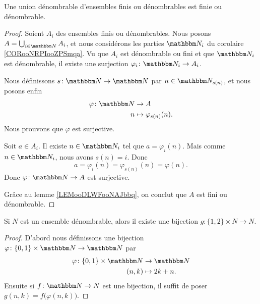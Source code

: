 \begin{proposition}     \label{PROPooENTPooSPpmhY}
    Une union dénombrable d'ensembles finis ou dénombrables est finie ou dénombrable.
\end{proposition}

\begin{proof}
    Soient \( A_i\) des ensembles finis ou dénombrables. Nous posons \( A=\bigcup_{i\in \eN}A_i\), et nous considérons les parties \( \eN_i\) du corolaire \ref{CORooNRPIooZPSmqa}. Vu que \( A_i\) est dénombrable ou fini et que \( \eN_i\) est dénombrable, il existe une surjection \( \varphi_i\colon \eN_i\to A_i\).

    Nous définissons \( s\colon \eN\to \eN\) par \( n\in \eN_{s(n)}\), et nous posons enfin
    \begin{equation}
        \begin{aligned}
            \varphi\colon \eN&\to A \\
            n&\mapsto \varphi_{s(n)}(n). 
        \end{aligned}
    \end{equation}
    Nous prouvons que \( \varphi\) est surjective.

    Soit \( a\in A_i\). Il existe \( n\in \eN_i\) tel que \( a=\varphi_i(n)\). Mais comme \( n\in \eN_i\), nous avons \( s(n)=i\). Donc
    \begin{equation}
        a=\varphi_i(n)=\varphi_{s(n)}(n)=\varphi(n).
    \end{equation}
    Donc \( \varphi\colon \eN\to A\) est surjective.

    Grâce au lemme \ref{LEMooDLWFooNAJbbq}, on conclut que \( A\) est fini ou dénombrable.
\end{proof}

\begin{lemma}        \label{LEMooRXSRooBUWOyb}
    Si \( N\) est un ensemble dénombrable, alors il existe une bijection \( g\colon \{ 1,2 \}\times N\to N\).
\end{lemma}

\begin{proof}
    D'abord nous définissons une bijection \( \varphi\colon \{ 0,1 \}\times \eN\to \eN\) par
    \begin{equation}
        \begin{aligned}
            \varphi\colon \{ 0,1 \}\times \eN&\to \eN \\
            (n,k)&\mapsto 2k+n. 
        \end{aligned}
    \end{equation}
    Ensuite si \( f\colon \eN\to N\) est une bijection, il suffit de poser \( g(n,k)=f\big( \varphi(n,k) \big)\).
\end{proof}

